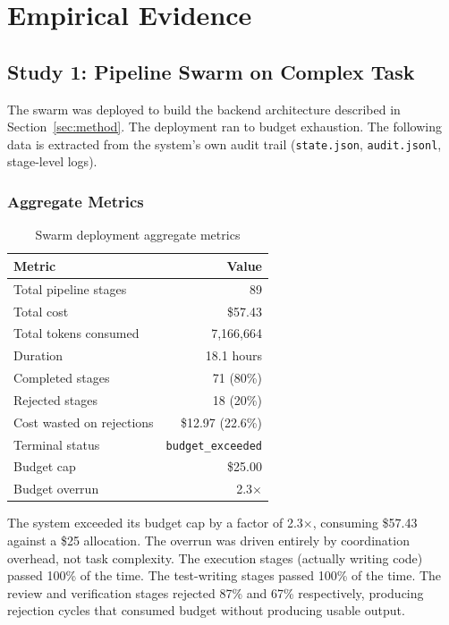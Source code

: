 \documentclass[11pt,a4paper]{article}
\begin{document}
\section{Empirical Evidence}
\label{sec:evidence}

\subsection{Study 1: Pipeline Swarm on Complex Task}

The swarm was deployed to build the backend architecture described in Section~\ref{sec:method}. The deployment ran to budget exhaustion. The following data is extracted from the system's own audit trail (\texttt{state.json}, \texttt{audit.jsonl}, stage-level logs).

\subsubsection{Aggregate Metrics}

\begin{table}[H]
\centering
\caption{Swarm deployment aggregate metrics}
\label{tab:aggregate}
\begin{tabular}{@{}lr@{}}
\toprule
\textbf{Metric} & \textbf{Value} \\
\midrule
Total pipeline stages & 89 \\
Total cost & \$57.43 \\
Total tokens consumed & 7,166,664 \\
Duration & 18.1 hours \\
Completed stages & 71 (80\%) \\
Rejected stages & 18 (20\%) \\
Cost wasted on rejections & \$12.97 (22.6\%) \\
Terminal status & \texttt{budget\_exceeded} \\
Budget cap & \$25.00 \\
Budget overrun & 2.3$\times$ \\
\bottomrule
\end{tabular}
\end{table}

The system exceeded its budget cap by a factor of 2.3$\times$, consuming \$57.43 against a \$25 allocation. The overrun was driven entirely by coordination overhead, not task complexity. The execution stages (actually writing code) passed 100\% of the time. The test-writing stages passed 100\% of the time. The review and verification stages rejected 87\% and 67\% respectively, producing rejection cycles that consumed budget without producing usable output.
\end{document}
